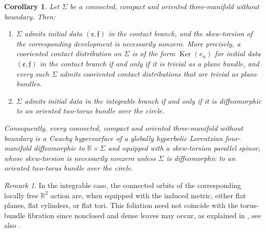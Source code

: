 \documentclass[10pt,reqno,a4paper]{amsart}
\theoremstyle{plain}
\newtheorem{cor}[thm]{Corollary}
\theoremstyle{definition}
\theoremstyle{remark}
\newtheorem{remark}[thm]{Remark}
\theoremstyle{remark}
\def\fre{\mathfrak{e}}
\newcommand{\Ker}{\operatorname{Ker}}
\renewcommand{\(}{ (}
\renewcommand{\)}{ )}
\newcommand{\frf}{\mathfrak{f}}
\begin{document}
\begin{cor}
\label{cor:compactconstraintbranches}
Let $\Sigma$ be a connected, compact and oriented three-manifold without boundary. Then:
\begin{enumerate}
\item $\Sigma$ admits initial data $(\fre,\frf)$ in the contact branch, and the skew-torsion of the corresponding development is necessarily nonzero. More precisely, a cooriented contact distribution on $\Sigma$ is of the form $\Ker(e_u)$ for initial data $(\fre,\frf)$ in the contact branch if and only if it is trivial as a plane bundle, and every such $\Sigma$ admits cooriented contact distributions that are trivial as plane bundles.
\item $\Sigma$ admits initial data in the integrable branch if and only if it is diffeomorphic to an oriented two-torus bundle over the circle.
\end{enumerate}

\noindent
Consequently, every connected, compact and oriented three-manifold without boundary is a Cauchy hypersurface of a globally hyperbolic Lorentzian four-manifold diffeomorphic to $\mathbb{R}\times \Sigma$ and equipped with a skew-torsion parallel spinor, whose skew-torsion is necessarily nonzero unless $\Sigma$ is diffeomorphic to an oriented two-torus bundle over the circle.  
\end{cor}

\begin{remark}
In the integrable case, the connected orbits of the corresponding locally free $\mathbb{R}^2$ action are, when equipped with the induced metric, either flat planes, flat cylinders, or flat tori. This foliation need not coincide with the torus-bundle fibration since nonclosed and dense leaves may occur, as explained in \cite[Proposition 3.15]{Murcia:2020zig}, see also \cite{Murcia:2021dur}.
\end{remark}
\end{document}
